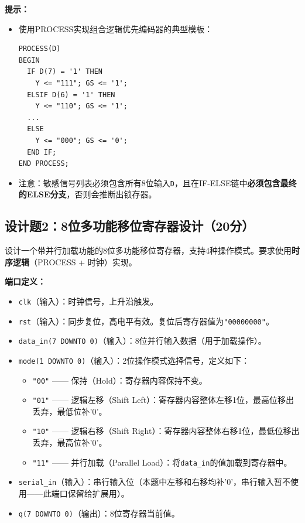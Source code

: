 \begin{framed}
\textbf{提示：}
\begin{itemize}
  \item 使用PROCESS实现组合逻辑优先编码器的典型模板：
\begin{verbatim}
PROCESS(D)
BEGIN
  IF D(7) = '1' THEN
    Y <= "111"; GS <= '1';
  ELSIF D(6) = '1' THEN
    Y <= "110"; GS <= '1';
  ...
  ELSE
    Y <= "000"; GS <= '0';
  END IF;
END PROCESS;
\end{verbatim}
  \item 注意：敏感信号列表必须包含所有8位输入\texttt{D}，且在IF-ELSE链中\textbf{必须包含最终的ELSE分支}，否则会推断出锁存器。
\end{itemize}
\end{framed}

\newpage

\subsection*{设计题2：8位多功能移位寄存器设计（20分）}

设计一个带并行加载功能的8位多功能移位寄存器，支持4种操作模式。要求使用\textbf{时序逻辑}（PROCESS + 时钟）实现。

\vspace{0.3cm}

\textbf{端口定义：}
\begin{itemize}
  \item \texttt{clk}（输入）：时钟信号，上升沿触发。
  \item \texttt{rst}（输入）：同步复位，高电平有效。复位后寄存器值为\texttt{"00000000"}。
  \item \texttt{data\_in(7 DOWNTO 0)}（输入）：8位并行输入数据（用于加载操作）。
  \item \texttt{mode(1 DOWNTO 0)}（输入）：2位操作模式选择信号，定义如下：
  \begin{itemize}
    \item \texttt{"00"} —— 保持（Hold）：寄存器内容保持不变。
    \item \texttt{"01"} —— 逻辑左移（Shift Left）：寄存器内容整体左移1位，最高位移出丢弃，最低位补'0'。
    \item \texttt{"10"} —— 逻辑右移（Shift Right）：寄存器内容整体右移1位，最低位移出丢弃，最高位补'0'。
    \item \texttt{"11"} —— 并行加载（Parallel Load）：将\texttt{data\_in}的值加载到寄存器中。
  \end{itemize}
  \item \texttt{serial\_in}（输入）：串行输入位（本题中左移和右移均补'0'，串行输入暂不使用——此端口保留给扩展用）。
  \item \texttt{q(7 DOWNTO 0)}（输出）：8位寄存器当前值。
\end{itemize}


